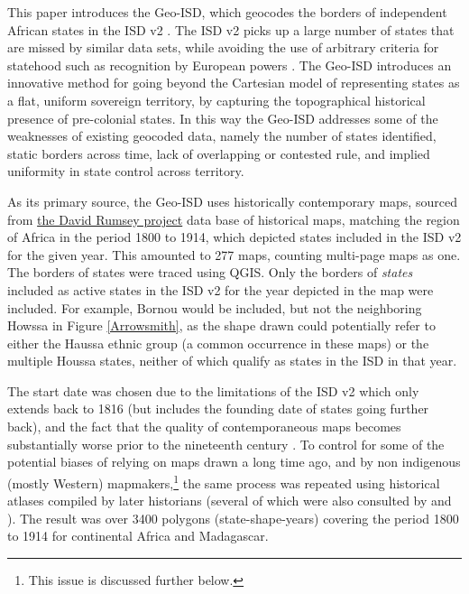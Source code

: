 This paper introduces the Geo-ISD, which geocodes the borders of independent
African states in the ISD v2 \citep{Butcher2020}. The ISD v2 picks up a large
number of states that are missed by similar data sets, while avoiding the use of
arbitrary criteria for statehood such as recognition by European powers
\citep{Butcher2020}. The Geo-ISD introduces an innovative method for going
beyond the Cartesian model of representing states as a flat, uniform sovereign
territory, by capturing the topographical historical presence of pre-colonial
states. In this way the Geo-ISD addresses some of the weaknesses of existing
geocoded data, namely the number of states identified, static borders across
time, lack of overlapping or contested rule, and implied uniformity in state
control across territory.

As its primary source, the Geo-ISD uses historically contemporary maps, sourced
from \href{https://www.davidrumsey.com}{the David Rumsey project} data base of
historical maps, matching the region of Africa in the period 1800 to 1914, which
depicted states included in the ISD v2 for the given year. This amounted to 277
maps, counting multi-page maps as one. The borders of states were traced using
QGIS. Only the borders of \textit{states} included as active states in the ISD
v2 for the year depicted in the map were included. For example, Bornou would be
included, but not the neighboring Howssa in Figure \ref{Arrowsmith}, as the
shape drawn could potentially refer to either the Haussa ethnic group (a common
occurrence in these maps) or the multiple Houssa states, neither of which
qualify as states in the ISD in that year. 

The start date was chosen due to the limitations of the ISD v2 which only extends
back to 1816 (but includes the founding date of states going further back), and
the fact that the quality of contemporaneous maps becomes substantially worse
prior to the nineteenth century \citep{Bassett_1994}. To control for some of the
potential biases of relying on maps drawn a long time ago, and by non indigenous
(mostly Western) mapmakers,\footnote{This issue is discussed further below.} the
same process was repeated using historical atlases compiled by later historians
(several of which were also consulted by \citet{Depetris-Chauvin2016} and
\citet{Paine2019}). The result was over 3400 polygons (state-shape-years)
covering the period 1800 to 1914 for continental Africa and Madagascar. 


